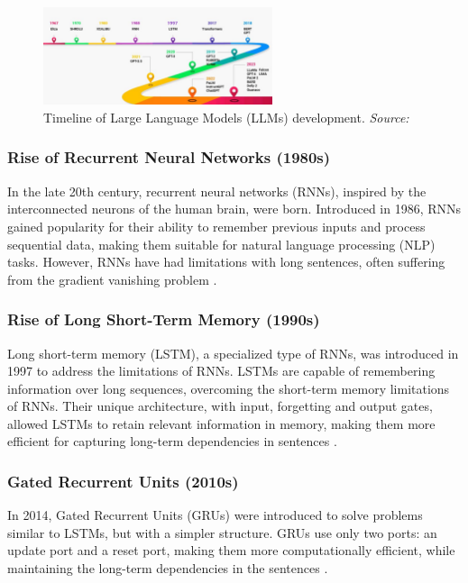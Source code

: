 \begin{figure}[h!]
    \centering
    \includegraphics[width=0.6\textwidth]{images/llms/llms-history.png}
    \caption{Timeline of Large Language Models (LLMs) development. \textit{Source:} \cite{AnalyticsVidhya2023}}
    \label{fig:llms-history}
\end{figure}

\subsubsection{Rise of Recurrent Neural Networks (1980s)}

In the late 20th century, recurrent neural networks (RNNs), inspired by the interconnected neurons of the human brain, were born. Introduced in 1986, RNNs gained popularity for their ability to remember previous inputs and process sequential data, making them suitable for natural language processing (NLP) tasks. However, RNNs have had limitations with long sentences, often suffering from the gradient vanishing problem \cite{elman1990finding}.

\subsubsection{Rise of Long Short-Term Memory (1990s)}

Long short-term memory (LSTM), a specialized type of RNNs, was introduced in 1997 to address the limitations of RNNs. LSTMs are capable of remembering information over long sequences, overcoming the short-term memory limitations of RNNs. Their unique architecture, with input, forgetting and output gates, allowed LSTMs to retain relevant information in memory, making them more efficient for capturing long-term dependencies in sentences \cite{hochreiter1997long}.

\subsubsection{Gated Recurrent Units (2010s)}

In 2014, Gated Recurrent Units (GRUs) were introduced to solve problems similar to LSTMs, but with a simpler structure. GRUs use only two ports: an update port and a reset port, making them more computationally efficient, while maintaining the long-term dependencies in the sentences \cite{cho2014learning}.

